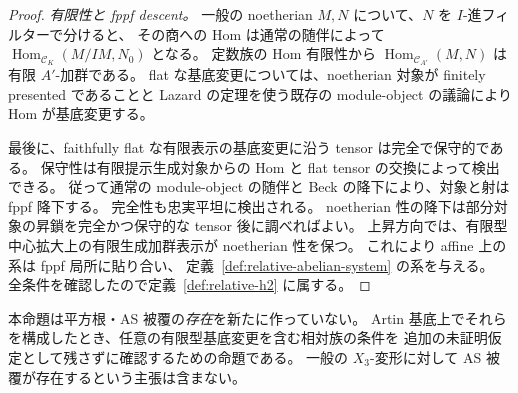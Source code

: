 \begin{proof}
\emph{有限性と fppf descent。}
一般の noetherian $M,N$ について、$N$ を $I$-進フィルターで分けると、
その商への Hom は通常の随伴によって
$\operatorname{Hom}_{\mathcal C_K}(M/IM,N_0)$ となる。
定数族の Hom 有限性から $\operatorname{Hom}_{\mathcal C_{A'}}(M,N)$ は有限 $A'$-加群である。
flat な基底変更については、noetherian 対象が finitely presented であることと
Lazard の定理を使う既存の module-object の議論により Hom が基底変更する。

最後に、faithfully flat な有限表示の基底変更に沿う tensor は完全で保守的である。
保守性は有限提示生成対象からの Hom と flat tensor の交換によって検出できる。
従って通常の module-object の随伴と Beck の降下により、対象と射は fppf 降下する。
完全性も忠実平坦に検出される。
noetherian 性の降下は部分対象の昇鎖を完全かつ保守的な tensor 後に調べればよい。
上昇方向では、有限型中心拡大上の有限生成加群表示が noetherian 性を保つ。
これにより affine 上の系は fppf 局所に貼り合い、
定義~\ref{def:relative-abelian-system} の系を与える。
全条件を確認したので定義~\ref{def:relative-h2} に属する。
\end{proof}

\begin{remark}
本命題は平方根・AS 被覆の\emph{存在}を新たに作っていない。
Artin 基底上でそれらを構成したとき、任意の有限型基底変更を含む相対族の条件を
追加の未証明仮定として残さずに確認するための命題である。
一般の $X_3$-変形に対して AS 被覆が存在するという主張は含まない。
\end{remark}

